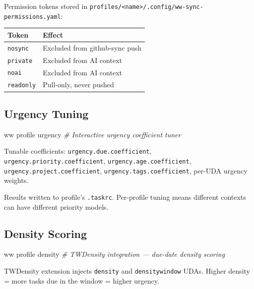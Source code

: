 \documentclass[
]{article}
\newenvironment{Shaded}{\begin{snugshade}}{\end{snugshade}}
\newcommand{\CommentTok}[1]{\textcolor[rgb]{0.56,0.35,0.01}{\textit{#1}}}
\newcommand{\ExtensionTok}[1]{#1}
\newcommand{\NormalTok}[1]{#1}
\newcounter{none} %
\begin{document}
Permission tokens stored in
\texttt{profiles/\textless{}name\textgreater{}/.config/ww-sync-permissions.yaml}:

{\def\LTcaptype{none} %
\begin{longtable}[]{@{}ll@{}}
\toprule\noalign{}
Token & Effect \\
\midrule\noalign{}
\endhead
\bottomrule\noalign{}
\endlastfoot
\texttt{nosync} & Excluded from github-sync push \\
\texttt{private} & Excluded from AI context \\
\texttt{noai} & Excluded from AI context \\
\texttt{readonly} & Pull-only, never pushed \\
\end{longtable}
}

\subsection{Urgency Tuning}\label{urgency-tuning}

\begin{Shaded}
\begin{Highlighting}[]
\ExtensionTok{ww}\NormalTok{ profile urgency    }\CommentTok{\# Interactive urgency coefficient tuner}
\end{Highlighting}
\end{Shaded}

Tunable coefficients: \texttt{urgency.due.coefficient},
\texttt{urgency.priority.coefficient}, \texttt{urgency.age.coefficient},
\texttt{urgency.project.coefficient}, \texttt{urgency.tags.coefficient},
per-UDA urgency weights.

Results written to profile's \texttt{.taskrc}. Per-profile tuning means
different contexts can have different priority models.

\subsection{Density Scoring}\label{density-scoring}

\begin{Shaded}
\begin{Highlighting}[]
\ExtensionTok{ww}\NormalTok{ profile density    }\CommentTok{\# TWDensity integration — due{-}date density scoring}
\end{Highlighting}
\end{Shaded}

TWDensity extension injects \texttt{density} and \texttt{densitywindow}
UDAs. Higher density = more tasks due in the window = higher urgency.
\end{document}
